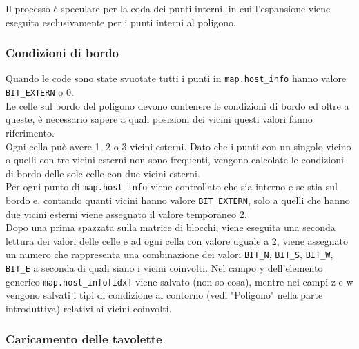 				Il processo \`{e} speculare per la coda dei punti interni, in cui l'espansione viene eseguita esclusivamente per i punti interni al poligono.
 			\subsubsection{Condizioni di bordo}
 				Quando le code sono state svuotate tutti i punti in \texttt{map.host\_info} hanno valore \texttt{BIT\_EXTERN} o 0. \\
 				Le celle sul bordo del poligono devono contenere le condizioni di bordo ed oltre a queste, \`{e} necessario sapere a quali posizioni dei vicini questi valori fanno riferimento. \\
 				Ogni cella pu\`{o} avere 1, 2 o 3 vicini esterni. Dato che i punti con un singolo vicino o quelli con tre vicini esterni non sono frequenti, vengono calcolate le condizioni di bordo delle sole celle con due vicini esterni.\\
 				Per ogni punto di \texttt{map.host\_info} viene controllato che sia interno e se stia sul bordo e, contando quanti vicini hanno valore \texttt{BIT\_EXTERN}, solo a quelli che hanno due vicini esterni viene assegnato il valore temporaneo 2.\\
 				Dopo una prima spazzata sulla matrice di blocchi, viene eseguita una seconda lettura dei valori delle celle e ad ogni cella con valore uguale a 2, viene assegnato un numero che rappresenta una combinazione dei valori  \texttt{BIT\_N}, \texttt{BIT\_S}, \texttt{BIT\_W}, \texttt{BIT\_E} a seconda di quali siano i vicini coinvolti. Nel campo y dell'elemento generico \texttt{map.host\_info[idx]} viene salvato (non so cosa), mentre nei campi z e w vengono salvati i tipi di condizione al contorno (vedi "Poligono" nella parte introduttiva) relativi ai vicini coinvolti.
			\subsubsection{Caricamento delle tavolette}


